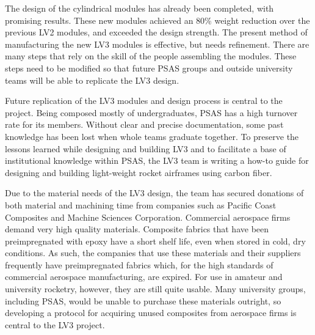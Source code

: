 \documentclass{aiaa-tc}%
\begin{document}
The design of the cylindrical modules has already been completed, with promising results. These new modules achieved an 80\% weight reduction over the previous LV2 modules, and exceeded the design strength. 
The present method of manufacturing the new LV3 modules is effective, but needs refinement. There are many steps that rely on the skill of the people assembling the modules. These steps need to be modified so that future PSAS groups and outside university teams will be able to replicate the LV3 design. 

Future replication of the LV3 modules and design process is central to the project. Being composed mostly of undergraduates, PSAS has a high turnover rate for its members. Without clear and precise documentation, some past knowledge has been lost when whole teams graduate together. 
To preserve the lessons learned while designing and building LV3 and to facilitate a base of institutional knowledge within PSAS, the LV3 team is writing a how-to guide for designing and building light-weight rocket airframes using carbon fiber.

Due to the material needs of the LV3 design, the team has secured donations of both material and machining time from companies such as Pacific Coast Composites and Machine Sciences Corporation. 
Commercial aerospace firms demand very high quality materials. Composite fabrics that have been preimpregnated with epoxy have a short shelf life, even when stored in cold, dry conditions. As such, the companies that use these materials and their suppliers frequently have  preimpregnated fabrics which, for the high standards of commercial aerospace manufacturing, are expired. 
For use in amateur and university rocketry, however, they are still quite usable. Many university groups, including PSAS, would be unable to purchase these materials outright, so developing a protocol for acquiring unused composites from aerospace firms is central to the LV3 project. 
\end{document}
